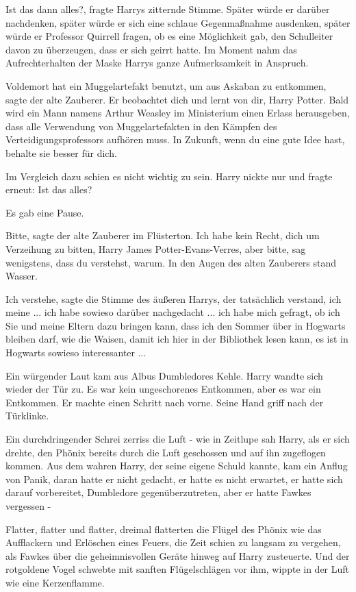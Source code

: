 \glqq{}Ist das dann alles?\grqq{}, fragte Harrys zitternde Stimme. Später würde
er darüber nachdenken, später würde er sich eine schlaue Gegenmaßnahme
ausdenken, später würde er Professor Quirrell fragen, ob es eine Möglichkeit
gab, den Schulleiter davon zu überzeugen, dass er sich geirrt hatte. Im Moment
nahm das Aufrechterhalten der Maske Harrys ganze Aufmerksamkeit in Anspruch.

\glqq{}Voldemort hat ein Muggelartefakt benutzt, um aus Askaban zu
entkommen\grqq{}, sagte der alte Zauberer. \glqq{}Er beobachtet dich und lernt
von dir, Harry Potter. Bald wird ein Mann namens Arthur Weasley im Ministerium
einen Erlass herausgeben, dass alle Verwendung von Muggelartefakten in den
Kämpfen des Verteidigungsprofessors aufhören muss. In Zukunft, wenn du eine gute
Idee hast, behalte sie besser für dich.\grqq{}

Im Vergleich dazu schien es nicht wichtig zu sein. Harry nickte nur und fragte
erneut: \glqq{}Ist das alles?\grqq{}

Es gab eine Pause.

\glqq{}Bitte\grqq{}, sagte der alte Zauberer im Flüsterton. \glqq{}Ich habe kein
Recht, dich um Verzeihung zu bitten, Harry James Potter-Evans-Verres, aber
bitte, sag wenigstens, dass du verstehst, warum.\grqq{} In den Augen des alten
Zauberers stand Wasser.

\glqq{}Ich verstehe\grqq{}, sagte die Stimme des äußeren Harrys, der tatsächlich
verstand, \glqq{}ich meine ... ich habe sowieso darüber nachgedacht ... ich habe
mich gefragt, ob ich Sie und meine Eltern dazu bringen kann, dass ich den Sommer
über in Hogwarts bleiben darf, wie die Waisen, damit ich hier in der Bibliothek
lesen kann, es ist in Hogwarts sowieso interessanter ...\grqq{}

Ein würgender Laut kam aus Albus Dumbledores Kehle. Harry wandte sich wieder der
Tür zu. Es war kein ungeschorenes Entkommen, aber es war ein Entkommen. Er
machte einen Schritt nach vorne. Seine Hand griff nach der Türklinke.

Ein durchdringender Schrei zerriss die Luft - wie in Zeitlupe sah Harry, als er
sich drehte, den Phönix bereits durch die Luft geschossen und auf ihn zugeflogen
kommen. Aus dem wahren Harry, der seine eigene Schuld kannte, kam ein Anflug von
Panik, daran hatte er nicht gedacht, er hatte es nicht erwartet, er hatte sich
darauf vorbereitet, Dumbledore gegenüberzutreten, aber er hatte Fawkes vergessen
-

Flatter, flatter und flatter, dreimal flatterten die Flügel des Phönix wie das
Aufflackern und Erlöschen eines Feuers, die Zeit schien zu langsam zu vergehen,
als Fawkes über die geheimnisvollen Geräte hinweg auf Harry zusteuerte. Und der
rotgoldene Vogel schwebte mit sanften Flügelschlägen vor ihm, wippte in der Luft
wie eine Kerzenflamme.

